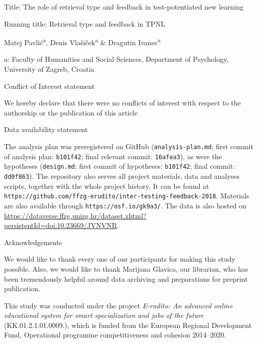 \documentclass[12pt]{article}
\begin{document}
\begin{titlepage}
    \begin{center}

        \vspace*{\fill}

        Title: The role of retrieval type and feedback in 
        test-potentiated new learning
        
        Running title: Retrieval type and feedback in TPNL

        \bigskip
        Matej Pavlić\textsuperscript{a}, Denis Vlašiček\textsuperscript{a} 
        \& Dragutin Ivanec\textsuperscript{a}

        a: Faculty of Humanities and Social Sciences, Department of 
        Psychology, University of Zagreb, Croatia

        \bigskip
		\bigskip
		\bigskip

	    \end{center}
		
		{\centering
			Conflict of Interest statement\par}
		We hereby declare that there were no conflicts of 
		interest with respect to the authorship or the 
		publication of this article
		
		\bigskip
		
		{\centering
		Data availability statement\par}

		The analysis plan was preregistered on GitHub 
		(\texttt{analysis-plan.md};
		first commit of analysis plan: \texttt{b101f42}; 
		final relevant commit:
		\texttt{16afea3}), as were the hypotheses 
		(\texttt{design.md}; first commit of hypotheses:
		\texttt{b101f42}; final commit: \texttt{dd0f863}).  
		The repository also serves all
		project materials, data and analyses scripts, 
		together with the whole project
		history. It can be found at
		\texttt{https://github.com/ffzg-erudito/inter-testing-feedback-2018}.
		Materials are also available through 
		\texttt{https://osf.io/gk9a3/}. The data
		is also hosted on
		\url{https://dataverse.ffzg.unizg.hr/dataset.xhtml?persistentId=doi:10.23669/JVNVNR}.

		\bigskip
		
		{\centering
			Acknowledgements\par}
		
		We would like to thank every one of our 
		participants for making this study
		possible. Also, we would like to thank Marijana 
		Glavica, our librarian,
		who has been tremendously helpful around data 
		archiving and preparations
		for preprint publication.	
		
                This study was conducted under the project \textit{E-rudito: An
                advanced online educational system for smart specialization and
                jobs of the future} (KK.01.2.1.01.0009.), which is funded from the
                European Regional Development Fund, Operational programme
                competitiveness and cohesion 2014--2020.
		
        \vspace*{\fill}

 

\end{titlepage}
\end{document}
